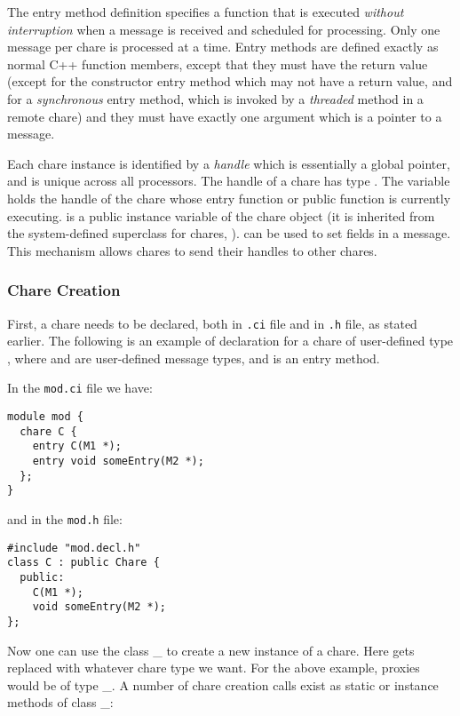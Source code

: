 The entry method definition specifies a function that is executed {\it
without interruption} when a message is received and scheduled for
processing. Only one message per chare is processed at a time.  Entry
methods are defined exactly as normal C++ function members, except
that they must have the return value  (except for the
constructor entry method which may not have a return value, and for a {\em synchronous}
entry method, which is invoked by a {\em threaded} method in a remote chare) and they
must have exactly one argument which is a pointer to a
message.

Each chare instance is identified by a {\it handle} 
which is essentially a global pointer, and is unique across all
processors.  The handle of a chare has type 
.  The
variable   holds the handle of the
chare whose entry function or public function is currently executing.
 is a public instance variable of the chare object
(it is inherited from the system-defined superclass for chares, ).
 can be used to set fields in a message. This  
mechanism allows chares to send their handles to other chares.

\subsubsection{Chare Creation}
\label{chare creation}

First, a chare needs to be declared, both in {\tt .ci} file and in
{\tt .h} file, as stated earlier. The following is an example of
declaration for a chare of user-defined type , where 
and  are user-defined message types, and 
is an entry method.

In the {\tt mod.ci} file we have:

\begin{verbatim}
module mod {
  chare C {
    entry C(M1 *);
    entry void someEntry(M2 *);
  };
}
\end{verbatim}

and in the {\tt mod.h} file:

\begin{verbatim}
#include "mod.decl.h"
class C : public Chare {
  public:
    C(M1 *);
    void someEntry(M2 *);
};
\end{verbatim}

Now one can use the class \_ to create
a new instance of a chare.  Here  gets replaced with
whatever chare type we want.  For the above example, proxies would
be of type \_. A number of chare creation calls
exist as static or instance methods of class \_:

